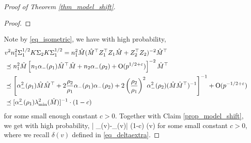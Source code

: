 \begin{proof}[Proof of Theorem \ref{thm_model_shift}]
\begin{proof}
\end{proof}
Note by \eqref{eq_isometric}, we have with high probability,
\begin{align*}
&v^2 n_1^2 \Sigma_1^{1/2} K \Sigma_2 K \Sigma_1^{1/2} =n_1^2 \hat M (\hat M^\top Z_1^\top Z_1 \hat M + Z_2^\top Z_2)^{-2}\hat M^\top \\
&\preceq  n_1^2 \hat M \left[n_1 \alpha_-(\rho_1)\hat M^\top \hat M + n_2 \alpha_-(\rho_2) + \operatorname{O}(p^{1/2+{\varepsilon}})\right]^{-2}\hat M^\top \\
&\preceq  \left[ \alpha_-^2(\rho_1) \hat M\hat M^\top + 2\frac{\rho_2}{\rho_1} \alpha_-(\rho_1)\alpha_-(\rho_2) + 2\left(\frac{\rho_2}{\rho_1}\right)^2 \alpha_-^2(\rho_2) (\hat M \hat M^\top )^{-1}\right]^{-1}+  \operatorname{O}(p^{-1/2+{\varepsilon}}) \\
&\preceq [\alpha_-^2(\rho_1) \lambda_{\min}^2(\hat M)]^{-1}\cdot (1 - c)
\end{align*}
for some small enough constant $c>0$. Together with Claim \ref{prop_model_shift}, we get with high probability,
\be\label{bounddelta-}
\left| \delta_{\bias}(v)-\wt\delta_{\bias}(v)\right| 
		\le (1-c) \delta(v)
\ee
for some small constant $c>0$, where we recall $\delta(v)$ defined in \eqref{eq_deltaextra}.



\end{proof}
